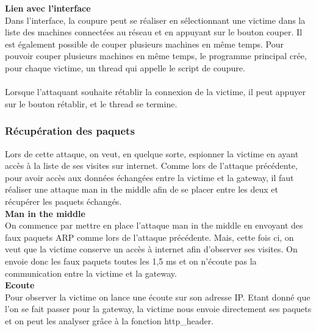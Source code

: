 \documentclass[11pt]{article}
\begin{document}
\textbf{Lien avec l'interface}~\\

Dans l'interface, la coupure peut se réaliser en sélectionnant une victime dans la liste des machines connectées au réseau et en appuyant sur le bouton couper. Il est également possible de couper plusieurs machines en même temps. Pour pouvoir couper plusieurs machines en même temps, le programme principal crée, pour chaque victime, un thread qui appelle le script de coupure. ~\\
~\\

Lorsque l'attaquant souhaite rétablir la connexion de la victime, il peut appuyer sur le bouton rétablir, et le thread se termine.~\\


\subsubsection{Récupération des paquets}
Lors de cette attaque, on veut, en quelque sorte, espionner la victime en ayant accès à la liste de ses visites sur internet. Comme lors de l'attaque précédente, pour avoir accès aux données échangées entre la victime et la gateway, il faut réaliser une attaque man in the middle afin de se placer entre les deux et récupérer les paquets échangés.~\\

\textbf{Man in the middle}~\\

On commence par mettre en place l'attaque man in the middle en envoyant des faux paquets ARP comme lors de l'attaque précédente. Mais, cette fois ci, on veut que la victime conserve un accès à internet afin d'observer ses visites. On envoie donc les faux paquets toutes les 1,5 ms et on n'écoute pas la communication entre la victime et la gateway.~\\


\textbf{Ecoute}~\\

Pour observer la victime on lance une écoute sur son adresse IP. Etant donné que l'on se fait passer pour la gateway, la victime nous envoie directement ses paquets et on peut les analyser grâce à la fonction http\_header.~\\

\end{document}
